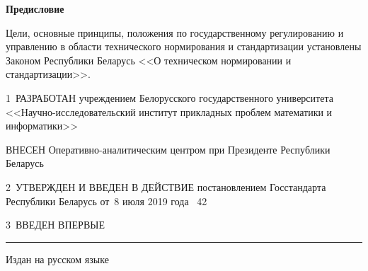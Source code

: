 \centerline{\bf Предисловие} 
Цели, основные принципы, положения по государственному регулированию и управлению в 
области технического нормирования и стандартизации установлены Законом 
Республики Беларусь <<О техническом нормировании и стандартизации>>. 

\vskip0.2cm

1~РАЗРАБОТАН учреждением Белорусского государственного университета 
<<Научно-исследовательский  институт прикладных проблем математики и 
информатики>>

ВНЕСЕН Оперативно-аналитическим центром при Президенте 
Республики Беларусь

2~УТВЕРЖДЕН И ВВЕДЕН В ДЕЙСТВИЕ постановлением Госстандарта Республики 
Беларусь от~8 июля 2019 года \No~42 

3~ВВЕДЕН ВПЕРВЫЕ

\vfill


\hrule
\vskip1mm
Издан на русском языке

\pagebreak

\pagebreak
